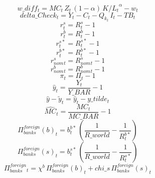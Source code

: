 \begin{dmath}
{w\_diff_{t}}={MC_{t}}\, {Z_{t}}\, \left(1-{\alpha }\right)\, {K/L_{t}}^{{\alpha }}-{w_{t}}
\end{dmath}
\begin{dmath}
{delta\_Check_{t}}={Y_{t}}-{C_{t}}-{ Q_k _{t}}\, {I_{t}}-{TB_{t}}
\end{dmath}
\begin{dmath}
{r^s_{t}}={R^s_{t}}-1
\end{dmath}
\begin{dmath}
{r^b_{t}}={R^b_{t}}-1
\end{dmath}
\begin{dmath}
{r^{s*}_{t}}={R^{s*}_{t}}-1
\end{dmath}
\begin{dmath}
{r^{b*}_{t}}={R^{b*}_{t}}-1
\end{dmath}
\begin{dmath}
{ r^s_{nom}_{t}}={ R^s_{nom}_{t}}-1
\end{dmath}
\begin{dmath}
{ r^b_{nom}_{t}}={ R^b_{nom}_{t}}-1
\end{dmath}
\begin{dmath}
{ \pi _{t}}={ \Pi _{t}}-1
\end{dmath}
\begin{dmath}
{ \hat{y} _{t}}=\frac{{Y_{t}}}{{Y\_BAR}}-1
\end{dmath}
\begin{dmath}
{ \hat{y} - \tilde{y} _{t}}={ \hat{y} _{t}}-{y\_tilde_{t}}
\end{dmath}
\begin{dmath}
{ \hat{MC} _{t}}=\frac{{MC_{t}}}{{MC\_BAR}}-1
\end{dmath}
\begin{dmath}
{\Pi^{foreign}_{banks}(b)_{t}}={b^{b*}_{t}}\, \left(\frac{1}{{R\_world}}-\frac{1}{{R^{b*}_{t}}}\right)
\end{dmath}
\begin{dmath}
{\Pi^{foreign}_{banks}(s)_{t}}={b^{s*}_{t}}\, \left(\frac{1}{{R\_world}}-\frac{1}{{R^{s*}_{t}}}\right)
\end{dmath}
\begin{dmath}
{\Pi^{foreign}_{banks}_{t}}={\chi^b }\, {\Pi^{foreign}_{banks}(b)_{t}}+{chi\_s}\, {\Pi^{foreign}_{banks}(s)_{t}}
\end{dmath}
